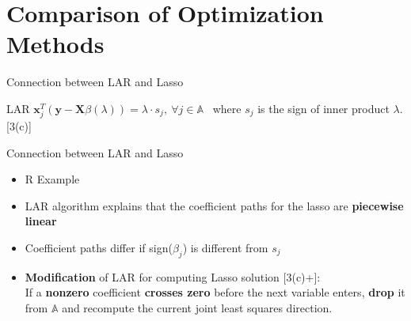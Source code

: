 \documentclass{beamer}
\begin{document}
\section{Comparison of Optimization Methods} %
\begin{frame}{Connection between LAR and Lasso}

\begin{block}{LAR}
\vspace*{2mm}
\(\textbf{x}_j^T (\textbf{y}-\textbf{X}\beta(\lambda))=\lambda \cdot s_j,\ 
\forall j \in \mathbb{A}\) \ where \(s_j\) is the sign of inner product \(\lambda\). [3(c)]\\
\end{block} 

\vspace*{3mm}

\end{frame}

\begin{frame}{Connection between LAR and Lasso}
\begin{itemize}
    \item  R Example
    \vspace*{3mm}
    \item LAR algorithm explains that the coefficient paths for the lasso are \textbf{piecewise linear}
    \vspace*{3mm}
    \item Coefficient paths differ if sign(\(\beta_j\)) is different from $s_j$ 
    \vspace*{3mm}
    
    \item \textbf{Modification} of LAR for computing Lasso solution [3(c)+]: \\
If a \textbf{nonzero} coefficient \textbf{crosses zero} before the next
variable enters, \textbf{drop} it from \(\mathbb{A}\) and recompute the current joint least squares
direction.
    
\end{itemize}
\end{frame}
\end{document}
